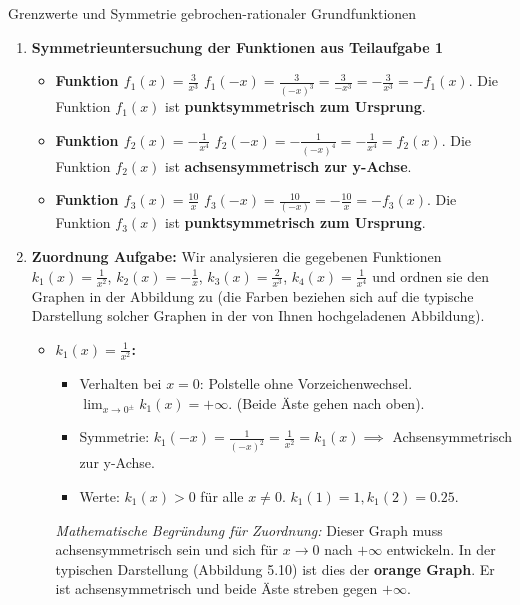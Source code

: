 \begin{loesungsumgebung}{Grenzwerte und Symmetrie gebrochen-rationaler Grundfunktionen}
\begin{enumerate}[label=(\alph*)]
    \item \textbf{Symmetrieuntersuchung der Funktionen aus Teilaufgabe 1}
    \begin{itemize}
        \item \textbf{Funktion $f_1(x) = \frac{3}{x^3}$}
        $f_1(-x) = \frac{3}{(-x)^3} = \frac{3}{-x^3} = -\frac{3}{x^3} = -f_1(x)$.
        Die Funktion $f_1(x)$ ist \textbf{punktsymmetrisch zum Ursprung}.

        \item \textbf{Funktion $f_2(x) = -\frac{1}{x^4}$}
        $f_2(-x) = -\frac{1}{(-x)^4} = -\frac{1}{x^4} = f_2(x)$.
        Die Funktion $f_2(x)$ ist \textbf{achsensymmetrisch zur y-Achse}.

        \item \textbf{Funktion $f_3(x) = \frac{10}{x}$}
        $f_3(-x) = \frac{10}{(-x)} = -\frac{10}{x} = -f_3(x)$.
        Die Funktion $f_3(x)$ ist \textbf{punktsymmetrisch zum Ursprung}.
    \end{itemize}

    \item \textbf{Zuordnung Aufgabe:}
    Wir analysieren die gegebenen Funktionen $k_1(x) = \frac{1}{x^2}$, $k_2(x) = -\frac{1}{x}$, $k_3(x) = \frac{2}{x^3}$, $k_4(x) = \frac{1}{x^4}$ und ordnen sie den Graphen in der Abbildung zu (die Farben beziehen sich auf die typische Darstellung solcher Graphen in der von Ihnen hochgeladenen Abbildung).

    \begin{itemize}
        \item \textbf{$k_1(x) = \frac{1}{x^2}$:}
        \begin{itemize}
            \item Verhalten bei $x=0$: Polstelle ohne Vorzeichenwechsel. $\lim_{x \to 0^\pm} k_1(x) = +\infty$. (Beide Äste gehen nach oben).
            \item Symmetrie: $k_1(-x) = \frac{1}{(-x)^2} = \frac{1}{x^2} = k_1(x) \implies$ Achsensymmetrisch zur y-Achse.
            \item Werte: $k_1(x) > 0$ für alle $x \neq 0$. $k_1(1)=1, k_1(2)=0.25$.
        \end{itemize}
        \textit{Mathematische Begründung für Zuordnung:} Dieser Graph muss achsensymmetrisch sein und sich für $x \to 0$ nach $+\infty$ entwickeln.
        In der typischen Darstellung (Abbildung 5.10) ist dies der \textbf{orange Graph}. Er ist achsensymmetrisch und beide Äste streben gegen $+\infty$.


\end{itemize}
\end{enumerate}
\end{loesungsumgebung}
